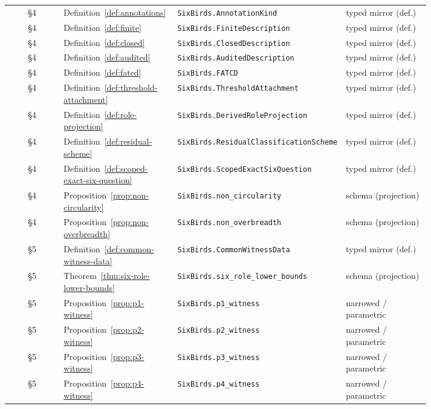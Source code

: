 {\begin{longtable}{@{}c >{\raggedright\arraybackslash}p{0.27\linewidth} >{\raggedright\arraybackslash}p{0.34\linewidth} >{\raggedright\arraybackslash}p{0.20\linewidth}@{}}
§4 & Definition~\ref{def:annotations} & \texttt{SixBirds.\allowbreak AnnotationKind} & typed mirror (def.) \\
§4 & Definition~\ref{def:finite} & \texttt{SixBirds.\allowbreak FiniteDescription} & typed mirror (def.) \\
§4 & Definition~\ref{def:closed} & \texttt{SixBirds.\allowbreak ClosedDescription} & typed mirror (def.) \\
§4 & Definition~\ref{def:audited} & \texttt{SixBirds.\allowbreak AuditedDescription} & typed mirror (def.) \\
§4 & Definition~\ref{def:fatcd} & \texttt{SixBirds.\allowbreak FATCD} & typed mirror (def.) \\
§4 & Definition~\ref{def:threshold-attachment} & \texttt{SixBirds.\allowbreak ThresholdAttachment} & typed mirror (def.) \\
§4 & Definition~\ref{def:role-projection} & \texttt{SixBirds.\allowbreak DerivedRoleProjection} & typed mirror (def.) \\
§4 & Definition~\ref{def:residual-scheme} & \texttt{SixBirds.\allowbreak ResidualClassificationScheme} & typed mirror (def.) \\
§4 & Definition~\ref{def:scoped-exact-six-question} & \texttt{SixBirds.\allowbreak ScopedExactSixQuestion} & typed mirror (def.) \\
§4 & Proposition~\ref{prop:non-circularity} & \texttt{SixBirds.\allowbreak non\_\allowbreak circularity} & schema (projection) \\
§4 & Proposition~\ref{prop:non-overbreadth} & \texttt{SixBirds.\allowbreak non\_\allowbreak overbreadth} & schema (projection) \\
§5 & Definition~\ref{def:common-witness-data} & \texttt{SixBirds.\allowbreak CommonWitnessData} & typed mirror (def.) \\
§5 & Theorem~\ref{thm:six-role-lower-bounds} & \texttt{SixBirds.\allowbreak six\_\allowbreak role\_\allowbreak lower\_\allowbreak bounds} & schema (projection) \\
§5 & Proposition~\ref{prop:p1-witness} & \texttt{SixBirds.\allowbreak p1\_\allowbreak witness} & narrowed / parametric \\
§5 & Proposition~\ref{prop:p2-witness} & \texttt{SixBirds.\allowbreak p2\_\allowbreak witness} & narrowed / parametric \\
§5 & Proposition~\ref{prop:p3-witness} & \texttt{SixBirds.\allowbreak p3\_\allowbreak witness} & narrowed / parametric \\
§5 & Proposition~\ref{prop:p4-witness} & \texttt{SixBirds.\allowbreak p4\_\allowbreak witness} & narrowed / parametric \\

\end{longtable}}

